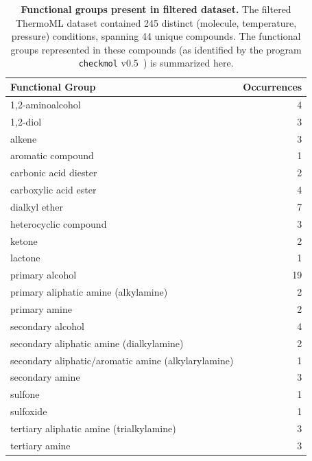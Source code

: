 \documentclass[aps,pre,twocolumn,nofootinbib,superscriptaddress,linenumbers]{revtex4-1}
\begin{document}
\begin{table}
\begin{tabular}{lr}
\toprule
{\bf Functional Group} &    {\bf Occurrences} \\
\midrule
1,2-aminoalcohol                                    &   4 \\
1,2-diol                                            &   3 \\
alkene                                              &   3 \\
aromatic compound                                   &   1 \\
carbonic acid diester                               &   2 \\
carboxylic acid ester                               &   4 \\
dialkyl ether                                       &   7 \\
heterocyclic compound                               &   3 \\
ketone                                              &   2 \\
lactone                                             &   1 \\
primary alcohol                                     &  19 \\
primary aliphatic amine (alkylamine)                &   2 \\
primary amine                                       &   2 \\
secondary alcohol                                   &   4 \\
secondary aliphatic amine (dialkylamine)            &   2 \\
secondary aliphatic/aromatic amine (alkylarylamine) &   1 \\
secondary amine                                     &   3 \\
sulfone                                             &   1 \\
sulfoxide                                           &   1 \\
tertiary aliphatic amine (trialkylamine)            &   3 \\
tertiary amine                                      &   3 \\
\bottomrule
\end{tabular}
\caption{{\bf Functional groups present in filtered dataset.}  
The filtered ThermoML dataset contained 245 distinct (molecule, temperature, pressure) conditions, spanning 44 unique compounds.
The functional groups represented in these compounds (as identified by the program {\tt checkmol} v0.5~\cite{haider2010functionality}) is summarized here.
}
\label{table:FunctionalGroups}
\end{table}
\end{document}
